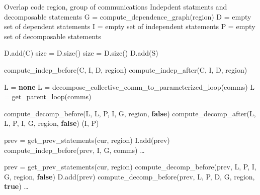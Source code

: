 \begin{algorithm}
{\scriptsize
\begin{algorithmic}
\Require Overlap code region, group of communications
\Ensure Indepdent statments and decomposable statements
  \State G = compute\_dependence\_graph(region)
  \State D = empty set of dependent statements
  \State I = empty set of independent statements
  \State P = empty set of decomposable statements

  \State {}
    \State D.add(C)
  \EndFor
  \State size = D.size()
    \State size = D.size()
        \State D.add(S)
      \EndIf
    \EndFor
  \EndWhile

  \State {}
    \State compute\_indep\_before(C, I, D, region)
    \State compute\_indep\_after(C, I, D, region)
  \EndFor

  \State {}
  \State L = \textbf{none}
    \State {}
    \State L = decompose\_collective\_comm\_to\_parameterized\_loop(comms)
    \State {}
    \State L = get\_parent\_loop(comms)
  \EndIf

  \State {}
    \State compute\_decomp\_before(L, L, P, I, G, region, \textbf{false})
    \State compute\_decomp\_after(L, L, P, I, G, region, \textbf{false})
  \EndIf
  \State \Return (I, P)
\EndFunction

    \State prev = get\_prev\_statements(cur, region)
      \State I.add(prev)
      \State compute\_indep\_before(prev, I, G, comms)
    \EndIf
  \EndIf
\EndFunction
{}
  \State \ldots
\EndFunction

    \State prev = get\_prev\_statements(cur, region)
      \State compute\_decomp\_before(prev, L, P, I, G, region, \textbf{false})
      \State D.add(prev)
      \State compute\_decomp\_before(prev, L, P, D, G, region, \textbf{true})
    \EndIf
  \EndIf
\EndFunction
{}
  \State \ldots
\EndFunction


\end{algorithmic}}
\end{algorithm}
